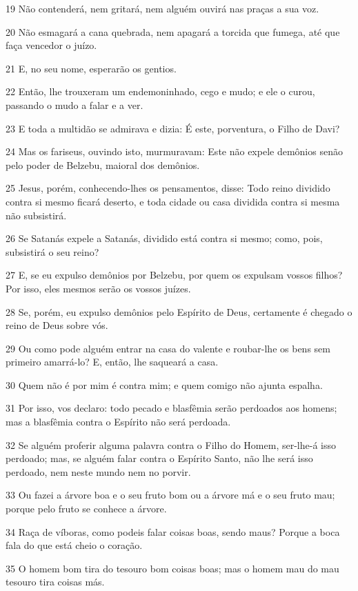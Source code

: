 \par 19 Não contenderá, nem gritará, nem alguém ouvirá nas praças a sua voz.
\par 20 Não esmagará a cana quebrada, nem apagará a torcida que fumega, até que faça vencedor o juízo.
\par 21 E, no seu nome, esperarão os gentios.
\par 22 Então, lhe trouxeram um endemoninhado, cego e mudo; e ele o curou, passando o mudo a falar e a ver.
\par 23 E toda a multidão se admirava e dizia: É este, porventura, o Filho de Davi?
\par 24 Mas os fariseus, ouvindo isto, murmuravam: Este não expele demônios senão pelo poder de Belzebu, maioral dos demônios.
\par 25 Jesus, porém, conhecendo-lhes os pensamentos, disse: Todo reino dividido contra si mesmo ficará deserto, e toda cidade ou casa dividida contra si mesma não subsistirá.
\par 26 Se Satanás expele a Satanás, dividido está contra si mesmo; como, pois, subsistirá o seu reino?
\par 27 E, se eu expulso demônios por Belzebu, por quem os expulsam vossos filhos? Por isso, eles mesmos serão os vossos juízes.
\par 28 Se, porém, eu expulso demônios pelo Espírito de Deus, certamente é chegado o reino de Deus sobre vós.
\par 29 Ou como pode alguém entrar na casa do valente e roubar-lhe os bens sem primeiro amarrá-lo? E, então, lhe saqueará a casa.
\par 30 Quem não é por mim é contra mim; e quem comigo não ajunta espalha.
\par 31 Por isso, vos declaro: todo pecado e blasfêmia serão perdoados aos homens; mas a blasfêmia contra o Espírito não será perdoada.
\par 32 Se alguém proferir alguma palavra contra o Filho do Homem, ser-lhe-á isso perdoado; mas, se alguém falar contra o Espírito Santo, não lhe será isso perdoado, nem neste mundo nem no porvir.
\par 33 Ou fazei a árvore boa e o seu fruto bom ou a árvore má e o seu fruto mau; porque pelo fruto se conhece a árvore.
\par 34 Raça de víboras, como podeis falar coisas boas, sendo maus? Porque a boca fala do que está cheio o coração.
\par 35 O homem bom tira do tesouro bom coisas boas; mas o homem mau do mau tesouro tira coisas más.
